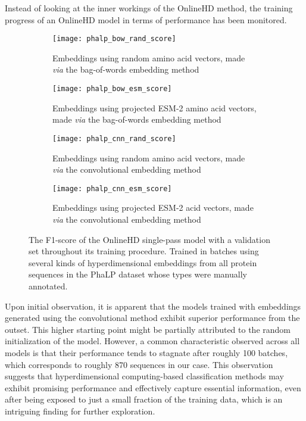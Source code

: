 Instead of looking at the inner workings of the OnlineHD method, the training progress of an OnlineHD model in terms of performance has been monitored.

\begin{figure}[h!]
    \centering
    \begin{subfigure}{0.48\textwidth}
        \texttt{[image: phalp\_bow\_rand\_score]}
        \caption{Embeddings using random amino acid vectors, made \textit{via} the bag-of-words embedding method}
        \label{fig:subfig-a3}
    \end{subfigure}
    \hfill
    \begin{subfigure}{0.48\textwidth}
        \texttt{[image: phalp\_bow\_esm\_score]}
        \caption{Embeddings using projected ESM-2 amino acid vectors, made \textit{via} the bag-of-words embedding method}
        \label{fig:subfig-b3}
    \end{subfigure}
    
    \begin{subfigure}{0.48\textwidth}
        \texttt{[image: phalp\_cnn\_rand\_score]}
        \caption{Embeddings using random amino acid vectors, made \textit{via} the convolutional embedding method}
        \label{fig:subfig-c3}
    \end{subfigure}
    \hfill
    \begin{subfigure}{0.48\textwidth}
        \texttt{[image: phalp\_cnn\_esm\_score]}
        \caption{Embeddings using projected ESM-2 acid vectors, made \textit{via} the convolutional embedding method}
        \label{fig:subfig-d3}
    \end{subfigure}
    \caption{The F1-score of the OnlineHD single-pass model with a validation set throughout its training procedure. Trained in batches using several kinds of hyperdimensional embeddings from all protein sequences in the PhaLP dataset whose types were manually annotated.}
    \label{fig:main39}
\end{figure}

Upon initial observation, it is apparent that the models trained with embeddings generated using the convolutional method exhibit superior performance from the outset. This higher starting point might be partially attributed to the random initialization of the model. However, a common characteristic observed across all models is that their performance tends to stagnate after roughly 100 batches, which corresponds to roughly 870 sequences in our case. This observation suggests that hyperdimensional computing-based classification methods may exhibit promising performance and effectively capture essential information, even after being exposed to just a small fraction of the training data, which is an intriguing finding for further exploration.


